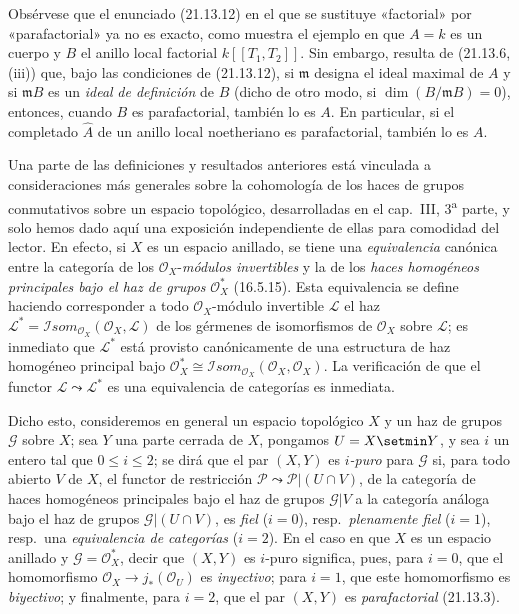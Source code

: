 \begin{env}[21.13.12.1]
\label{IV.21.13.12.1}
Obsérvese que el enunciado (21.13.12) en el que se sustituye «factorial» por «parafactorial»
ya no es exacto, como muestra el ejemplo en que $A=k$ es un cuerpo y $B$ el anillo
local factorial $k[[T_1,T_2]]$. Sin embargo, resulta de (21.13.6, (iii)) que, bajo
las condiciones de (21.13.12), si $\mathfrak m$ designa el ideal maximal de $A$ y si
$\mathfrak mB$ es un \emph{ideal}
\emph{de definición} de $B$ (dicho de otro modo, si $\dim(B/\mathfrak mB)=0$), entonces,
cuando $B$ es parafactorial, también lo es $A$. En particular, si el
completado $\widehat A$ de un anillo local noetheriano es parafactorial, también lo es
$A$.
\end{env}

\begin{remark}[21.13.13]
\label{IV.21.13.13}
Una parte de las definiciones y resultados anteriores está vinculada a consideraciones
más generales sobre la cohomología de los haces de grupos conmutativos sobre un espacio
topológico, desarrolladas en el cap.~III, 3\textsuperscript{a} parte, y solo hemos
dado aquí una exposición independiente de ellas para comodidad del lector. En efecto, si $X$
es un espacio anillado, se tiene una \emph{equivalencia} canónica entre la categoría de los
$\mathcal O_X$-\emph{módulos invertibles} y la de los \emph{haces homogéneos principales
bajo el haz de grupos} $\mathcal O_X^*$ (16.5.15). Esta equivalencia se define
haciendo corresponder a todo $\mathcal O_X$-módulo invertible $\mathscr L$ el
haz $\mathscr L^*=\mathscr Isom_{\mathcal O_X}(\mathcal O_X,\mathscr L)$ de los
gérmenes de isomorfismos de $\mathcal O_X$ sobre $\mathscr L$; es inmediato que
$\mathscr L^*$ está provisto canónicamente de una estructura de haz homogéneo principal
bajo $\mathcal O_X^*\cong\mathscr Isom_{\mathcal O_X}(\mathcal O_X,\mathcal O_X)$.
La verificación de que el functor $\mathscr L\leadsto\mathscr L^*$ es una
equivalencia de categorías es inmediata.

Dicho esto, consideremos en general un espacio topológico $X$ y un haz de
grupos $\mathscr G$ sobre $X$; sea $Y$ una parte cerrada de $X$, pongamos $U=X\setmin Y$, y
sea $i$ un entero tal que $0\leq i\leq2$; se dirá que el par $(X,Y)$ es
\emph{$i$-puro} para $\mathscr G$ si, para todo abierto $V$ de $X$, el functor de
restricción $\mathscr P\leadsto\mathscr P|(U\cap V)$, de la categoría de haces
homogéneos principales bajo el haz de grupos $\mathscr G|V$ a la categoría
análoga bajo el haz de grupos $\mathscr G|(U\cap V)$, es \emph{fiel}
($i=0$), resp.\ \emph{plenamente fiel} ($i=1$), resp.\ una \emph{equivalencia de
categorías} ($i=2$). En el caso en que $X$ es un espacio anillado y
$\mathscr G=\mathcal O_X^*$, decir que $(X,Y)$ es $i$-puro significa, pues, para $i=0$,
que el homomorfismo $\mathcal O_X\to j_*(\mathcal O_U)$ es \emph{inyectivo}; para
$i=1$, que este homomorfismo es \emph{biyectivo}; y finalmente, para $i=2$, que el par
$(X,Y)$ es \emph{parafactorial} (21.13.3).


\end{remark}
